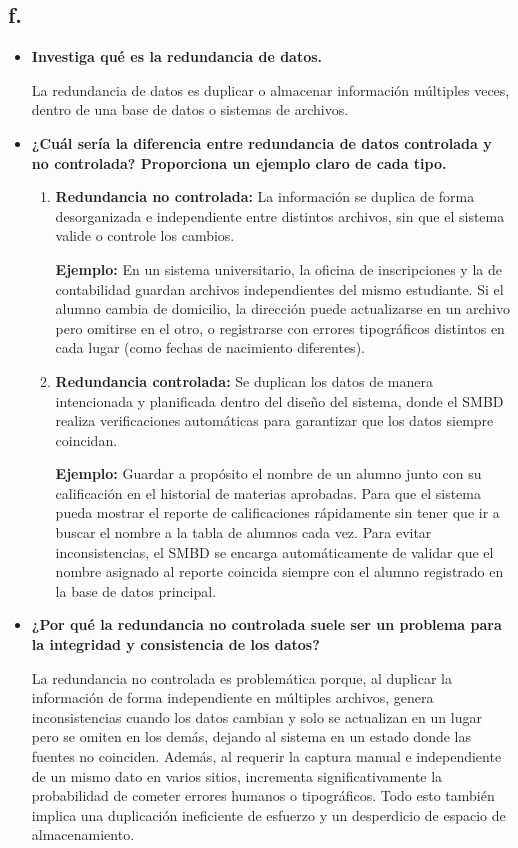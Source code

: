\subsection*{f.}

\begin{itemize}
    \item \textbf{Investiga qué es la redundancia de datos.}
    
    La redundancia de datos es duplicar o almacenar información múltiples veces, dentro de una base de datos o sistemas de archivos.
    \item \textbf{¿Cuál sería la diferencia entre redundancia de datos controlada y no controlada? Proporciona un ejemplo claro de cada tipo.}
    \begin{enumerate}
        \item \textbf{Redundancia no controlada:} La información se duplica de forma desorganizada e independiente entre distintos archivos, sin que el sistema valide o controle los cambios.
        
        \textbf{Ejemplo:} En un sistema universitario, la oficina de inscripciones y la de contabilidad guardan archivos independientes del mismo estudiante. Si el alumno cambia de domicilio, la dirección puede actualizarse en un archivo pero omitirse en el otro, o registrarse con errores tipográficos distintos en cada lugar (como fechas de nacimiento diferentes).
        
        \item \textbf{Redundancia controlada:} Se duplican los datos de manera intencionada y planificada dentro del diseño del sistema, donde el SMBD realiza verificaciones automáticas para garantizar que los datos siempre coincidan.
        
        \textbf{Ejemplo:} Guardar a propósito el nombre de un alumno junto con su calificación en el historial de materias aprobadas. Para que el sistema pueda mostrar el reporte de calificaciones rápidamente sin tener que ir a buscar el nombre a la tabla de alumnos cada vez. Para evitar inconsistencias, el SMBD se encarga automáticamente de validar que el nombre asignado al reporte coincida siempre con el alumno registrado en la base de datos principal.
    \end{enumerate}
    \item \textbf{¿Por qué la redundancia no controlada suele ser un problema para la integridad y consistencia de los datos?}
    
    La redundancia no controlada es problemática porque, al duplicar la información de forma independiente en múltiples archivos, genera inconsistencias cuando los datos cambian y solo se actualizan en un lugar pero se omiten en los demás, dejando al sistema en un estado donde las fuentes no coinciden. Además, al requerir la captura manual e independiente de un mismo dato en varios sitios, incrementa significativamente la probabilidad de cometer errores humanos o tipográficos. Todo esto  también implica una duplicación ineficiente de esfuerzo y un desperdicio de espacio de almacenamiento.
    
\end{itemize}